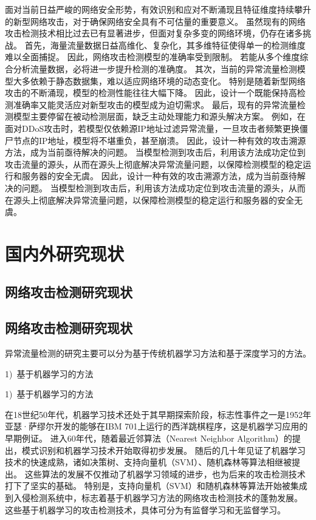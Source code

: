 面对当前日益严峻的网络安全形势，有效识别和应对不断涌现且特征维度持续攀升的新型网络攻击，对于确保网络安全具有不可估量的重要意义。
虽然现有的网络攻击检测技术相比过去已有显著进步，但面对复杂多变的网络环境，仍存在诸多挑战。
首先，海量流量数据日益高维化、复杂化，其多维特征使得单一的检测维度难以全面捕捉。
因此，网络攻击检测模型的准确率受到限制。
若能从多个维度综合分析流量数据，必将进一步提升检测的准确度。
其次，当前的异常流量检测模型大多依赖于静态数据集，难以适应网络环境的动态变化。
特别是随着新型网络攻击的不断涌现，模型的检测性能往往大幅下降。
因此，设计一个既能保持高检测准确率又能灵活应对新型攻击的模型成为迫切需求。
最后，现有的异常流量检测模型主要停留在被动检测层面，缺乏主动处理能力和源头解决方案。
例如，在面对DDoS攻击时，若模型仅依赖源IP地址过滤异常流量，一旦攻击者频繁更换僵尸节点的IP地址，模型将不堪重负，甚至崩溃。
因此，设计一种有效的攻击溯源方法，成为当前亟待解决的问题。
当模型检测到攻击后，利用该方法成功定位到攻击流量的源头，从而在源头上彻底解决异常流量问题，以保障检测模型的稳定运行和服务器的安全无虞。
因此，设计一种有效的攻击溯源方法，成为当前亟待解决的问题。
当模型检测到攻击后，利用该方法成功定位到攻击流量的源头，从而在源头上彻底解决异常流量问题，以保障检测模型的稳定运行和服务器的安全无虞。

\section{国内外研究现状}

\subsection{网络攻击检测研究现状}

\subsection{网络攻击检测研究现状}
异常流量检测的研究主要可以分为基于传统机器学习方法和基于深度学习的方法。\par
1)~基于机器学习的方法\par
1)~基于机器学习的方法\par
在18世纪50年代，机器学习技术还处于其早期探索阶段，标志性事件之一是1952年亚瑟·萨缪尔开发的能够在IBM 701上运行的西洋跳棋程序，这是机器学习应用的早期例证。
进入60年代，随着最近邻算法（Nearest Neighbor Algorithm）\cite{taunk2019brief}的提出，模式识别和机器学习技术开始取得初步发展。
随后的几十年见证了机器学习技术的快速成熟，诸如决策树\cite{charbuty2021classification}、支持向量机（SVM）\cite{zhang2021support}、随机森林\cite{athey2019generalized}等算法相继被提出。
这些算法的发展不仅推动了机器学习领域的进步，也为后来的攻击检测技术打下了坚实的基础。
特别是，支持向量机（SVM）和随机森林等算法开始被集成到入侵检测系统中，标志着基于机器学习方法的网络攻击检测技术的蓬勃发展\cite{amaran2021intrusion}。
这些基于机器学习的攻击检测技术，具体可分为有监督学习和无监督学习。



